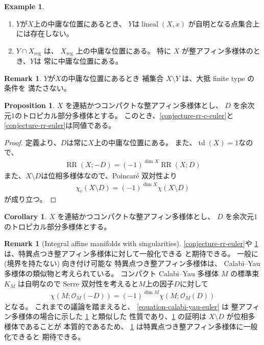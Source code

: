 \documentclass[a4paper,dvipdfmx,reqno,12pt]{amsart}
\theoremstyle{definition}
\newtheorem{example}[theorem]{Example}
\newtheorem{proposition}[theorem]{Proposition}
\newtheorem{corollary}[theorem]{Corollary}
\newtheorem{remark}[theorem]{Remark}
\newcommand{\opn}[1]{\operatorname{#1}}
\numberwithin{equation}{section}
\begin{document}
\begin{example}
\begin{enumerate}
\item $Y$が$X$上の中庸な位置にあるとき、
$Y$は$\opn{lineal}(X,x)$
が自明となる点集合上には存在しない。
\item $Y\cap X_{\mathrm{reg}}$ は、
$X_{\mathrm{reg}}$ 上の中庸な位置にある。
特に $X$ が整アフィン多様体のとき、$Y$は
常に中庸な位置にある。
\end{enumerate}

\end{example}

\begin{remark}
$Y$が$X$の中庸な位置にあるとき
補集合 $X\setminus Y$ は、大抵 finite type の条件を
満たさない。
\end{remark}

\begin{proposition}
\label{proposition-divisor-poincare}
$X$ を連結かつコンパクトな整アフィン多様体とし、
$D$ を余次元$1$のトロピカル部分多様体とする。
このとき、\cref{conjecture-rr-c-euler}と
\cref{conjecture-rr-euler}は同値である。
\end{proposition}
\begin{proof}
定義より、$D$は常に$X$上の中庸な位置にある。
また、$\opn{td}(X)=1$なので、
\begin{align}
\opn{RR}(X;-D)=(-1)^{\dim X}\opn{RR}(X;D)
\end{align}
また、$X\setminus D$は位相多様体なので、Poincar\'e 双対性より
\begin{align}
\chi_c(X\setminus D)=(-1)^{\dim X}\chi(X\setminus D)
\end{align}
が成り立つ。
\end{proof}

\begin{corollary}
$X$ を連結かつコンパクトな整アフィン多様体とし、
$D$ を余次元$1$のトロピカル部分多様体とする。	
\end{corollary}

\begin{remark}[{Integral affine manifolds with singularities}]
\label{remark-iass}
\cref{conjecture-rr-euler}や
\cref{proposition-divisor-poincare}
は、特異点つき整アフィン多様体に対して一般化できる
と期待できる。
一般に (境界を持たない) 向き付け可能な
特異点つき整アフィン多様体は、
Calabi--Yau 多様体の類似物と考えられている。
コンパクト Calabi--Yau 多様体 $M$ の標準束
$K_M$ は自明なので
Serre 双対性を考えると$M$上の因子$D$に対して
\begin{align}
\label{equation-calabi-yau-euler}
\chi(M;\mathcal{O}_M(-D))=(-1)^{\dim M}
\chi(M;\mathcal{O}_{M}(D))
\end{align}
となる。
これまでの議論を踏まえると、
\cref{equation-calabi-yau-euler} は
整アフィン多様体の場合に示した
\cref{proposition-divisor-poincare} と類似した
性質であり、\cref{proposition-divisor-poincare}
の証明は $X\setminus D$ が位相多様体であることが
本質的であるため、
\cref{proposition-divisor-poincare}
は特異点つき整アフィン多様体に一般化できると
期待できる。
\end{remark}
\end{document}
